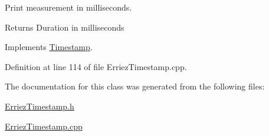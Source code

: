 Print measurement in milliseconds. 

\begin{DoxyReturn}{Returns}
Duration in milliseconds 
\end{DoxyReturn}


Implements \hyperlink{class_timestamp_a351537b95385937a004ab32b6b3743f7}{Timestamp}.



Definition at line 114 of file Erriez\+Timestamp.\+cpp.



The documentation for this class was generated from the following files\+:\begin{DoxyCompactItemize}
\item 
\hyperlink{_erriez_timestamp_8h}{Erriez\+Timestamp.\+h}\item 
\hyperlink{_erriez_timestamp_8cpp}{Erriez\+Timestamp.\+cpp}\end{DoxyCompactItemize}
